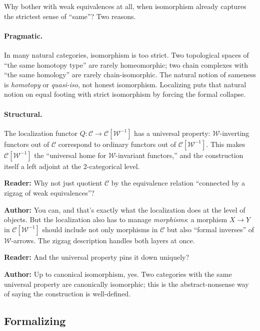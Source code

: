 Why bother with weak equivalences at all, when isomorphism already
captures the strictest sense of ``same''? Two reasons.

\paragraph{Pragmatic.} In many natural categories, isomorphism is too
strict. Two topological spaces of ``the same homotopy type'' are rarely
homeomorphic; two chain complexes with ``the same homology'' are
rarely chain-isomorphic. The natural notion of sameness is
\emph{homotopy} or \emph{quasi-iso}, not honest isomorphism. Localizing
puts that natural notion on equal footing with strict isomorphism by
forcing the formal collapse.

\paragraph{Structural.} The localization functor $Q : \mathcal{C} \to
\mathcal{C}[\mathcal{W}^{-1}]$ has a universal property:
$\mathcal{W}$-inverting functors out of $\mathcal{C}$ correspond to
ordinary functors out of $\mathcal{C}[\mathcal{W}^{-1}]$. This makes
$\mathcal{C}[\mathcal{W}^{-1}]$ the ``universal home for
$\mathcal{W}$-invariant functors,'' and the construction itself a left
adjoint at the $2$-categorical level.

\begin{dialog}
\textbf{Reader:} Why not just quotient $\mathcal{C}$ by the equivalence
relation ``connected by a zigzag of weak equivalences''?

\textbf{Author:} You can, and that's exactly what the localization does
at the level of objects. But the localization also has to manage
\emph{morphisms}: a morphism $X \to Y$ in $\mathcal{C}[\mathcal{W}^{-1}]$
should include not only morphisms in $\mathcal{C}$ but also ``formal
inverses'' of $\mathcal{W}$-arrows. The zigzag description handles
both layers at once.

\textbf{Reader:} And the universal property pins it down uniquely?

\textbf{Author:} Up to canonical isomorphism, yes. Two categories with
the same universal property are canonically isomorphic; this is the
abstract-nonsense way of saying the construction is well-defined.
\end{dialog}

\subsection{Formalizing}

